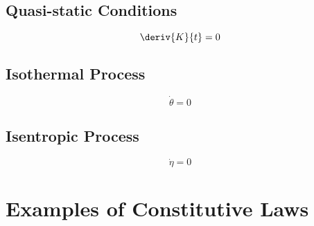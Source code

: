 \documentclass[a5paper,twosided,11pt,DIV=15,BCOR=0mm]{scrbook}
\begin{document}
\subsection{Quasi-static Conditions}
\begin{equation}
  \deriv{K}{t} = 0
\end{equation}
\subsection{Isothermal Process}
\begin{equation}
  \dot{\theta} = 0
\end{equation}
\subsection{Isentropic Process}
\begin{equation}
  \dot{\eta} = 0
\end{equation}
\section{Examples of Constitutive Laws}
\end{document}
